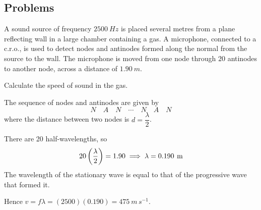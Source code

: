 \subsection*{Problems}
\begin{prbm}
A sound source of frequency $2500\:\unit{Hz}$ is placed several metres from a plane reflecting wall in a large chamber containing a gas. A microphone, connected to a c.r.o., is used to detect nodes and antinodes formed along the normal from the source to the wall. The microphone is moved from one node through $20$ antinodes to another node, across a distance of $1.90\:\unit{m}$.

Calculate the speed of sound in the gas.
\end{prbm}
\begin{solution}
The sequence of nodes and antinodes are given by
\[ N \quad A \quad N \quad \cdots \quad N \quad A \quad N \]
where the distance between two nodes is $d=\dfrac{\lambda}{2}$.

There are 20 half-wavelengths, so 
\[ 20\left(\frac{\lambda}{2}\right)=1.90 \implies \lambda=0.190\:\,\mathrm{m} \]
The wavelength of the stationary wave is equal to that of the progressive wave that formed it.

Hence $v=f\lambda=(2500)(0.190)=\boxed{475\:\unit{m\,s^{-1}}}$.
\end{solution}

\pagebreak
